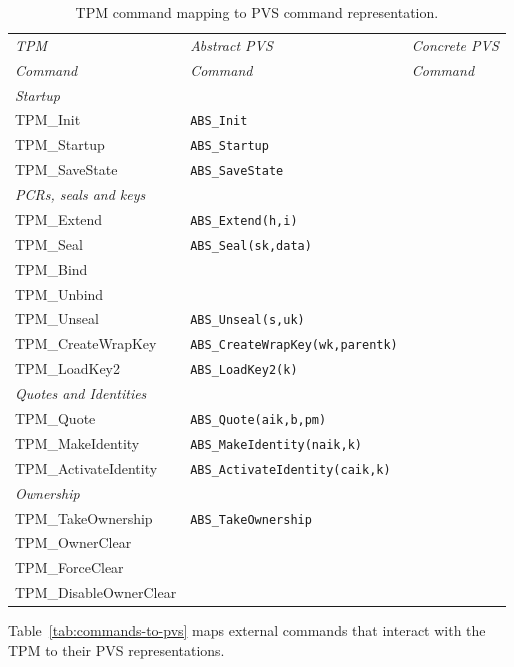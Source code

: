 \documentclass[10pt]{article}
\begin{document}
\begin{table}[hbtp]
  \centering
  \begin{tabular}{lll}
    \hline
    \emph{TPM} & \emph{Abstract PVS} & \emph{Concrete PVS} \\
    \emph{Command} & \emph{Command} & \emph{Command} \\ \hline
    \multicolumn{3}{l}{\emph{Startup}}  \\ \hline
    \textsf{TPM\_Init} & \verb+ABS_Init+ & \\ 
    \textsf{TPM\_Startup} & \verb+ABS_Startup+ & \\
    \textsf{TPM\_SaveState} & \verb+ABS_SaveState+ & \\ \hline
    \multicolumn{3}{l}{\emph{PCRs, seals and keys}}  \\ \hline
    \textsf{TPM\_Extend} & \verb+ABS_Extend(h,i)+ & \\
    \textsf{TPM\_Seal} & \verb+ABS_Seal(sk,data)+& \\
    \textsf{TPM\_Bind} & & \\
    \textsf{TPM\_Unbind} & & \\
    \textsf{TPM\_Unseal} & \verb+ABS_Unseal(s,uk)+ & \\
    \textsf{TPM\_CreateWrapKey} & \verb+ABS_CreateWrapKey(wk,parentk)+ & \\
    \textsf{TPM\_LoadKey2} & \verb+ABS_LoadKey2(k)+ & \\ \hline
    \multicolumn{3}{l}{\emph{Quotes and Identities}}  \\ \hline
    \textsf{TPM\_Quote} & \verb+ABS_Quote(aik,b,pm)+ & \\
    \textsf{TPM\_MakeIdentity} & \verb+ABS_MakeIdentity(naik,k)+ & \\
    \textsf{TPM\_ActivateIdentity} & \verb+ABS_ActivateIdentity(caik,k)+ & \\
    \multicolumn{3}{l}{\emph{Ownership}}  \\ \hline
    \textsf{TPM\_TakeOwnership} & \verb+ABS_TakeOwnership+ & \\ \hline
    \textsf{TPM\_OwnerClear} & & \\
    \textsf{TPM\_ForceClear} & & \\ 
    \textsf{TPM\_DisableOwnerClear} & & \\
    \hline
  \end{tabular}
  \caption{TPM command mapping to PVS command representation.}
  \label{tab:tpm-to-pvs}
\end{table}

Table~\ref{tab:commands-to-pvs} maps external commands that interact
with the TPM to their PVS representations.
\end{document}
